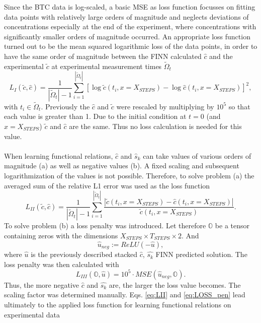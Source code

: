 Since the BTC data is log-scaled, a basic MSE as loss function focusses on fitting data points with relatively large orders of magnitude and neglects deviations of concentrations especially at the end of the experiment, where concentrations with significantly smaller orders of magnitude occurred. An appropriate loss function turned out to be the mean squared logarithmic loss of the data points, in order to have the same order of magnitude between the FINN calculated $\hat{c}$ and the experimental $\tilde{c}$ at experimental measurement times $\tilde{\Omega}_t$
\begin{equation}
    L_{I}(\tilde{c},\hat{c}) = \frac{1}{|\tilde{\Omega}_t|-1}\sum_{i=1}^{|\tilde{\Omega}_t|} \left[\log\tilde{c}(t_i,x = X_{STEPS}) - \log\hat{c}(t_i, x=X_{STEPS})\right]^2,
    \label{eq:LI}
\end{equation}
with $t_i \in \tilde{\Omega}_t$. Previously the $\hat{c}$ and $\tilde{c}$ were rescaled by multiplying by $10^{5}$ so that each value is greater than 1. Due to the initial condition at $t = 0$ (and $x = X_{STEPS}$) $\tilde{c}$ and $\hat{c}$ are the same. Thus no loss calculation is needed for this value.
\\
\\
When learning functional relations, $\hat{c}$ and $\hat{s}_k$ can take values of various orders of magnitude (a) as well as negative values (b). A fixed scaling and subsequent logarithmization of the values is not possible. Therefore, to solve problem (a) the averaged sum of the relative L1 error was used as the loss function
\begin{equation}
    L_{II}(\tilde{c},\hat{c}) = \frac{1}{|\tilde{\Omega}_t|-1}\sum_{i=1}^{|\tilde{\Omega}_t|} \frac{|\tilde{c}(t_i,x = X_{STEPS}) - \hat{c}(t_i, x=X_{STEPS})|}{\tilde{c}(t_i,x = X_{STEPS})}.
    \label{eq:LII}
\end{equation}
To solve problem (b) a loss penalty was introduced. Let therefore $\mathbb{O}$ be a tensor containing zeros with the dimensions $X_{STEPS} \times T_{STEPS} \times 2$. And
\begin{equation}
    \hat{u}_{neg} := ReLU(-\hat{u}),
\end{equation}
where $\hat{u}$ is the previously described stacked $\hat{c}$, $\hat{s_k}$ FINN predicted solution. The loss penalty was then calculated with
\begin{equation}
    L_{III}(\mathbb{O},\hat{u}) = 10^5 \cdot MSE(\hat{u}_{neg}, \mathbb{O}).
    \label{eq:LOSS_pen}
\end{equation}
Thus, the more negative $\hat{c}$ and $\hat{s_k}$ are, the larger the loss value becomes. The scaling factor was determined manually. Eqs. \ref{eq:LII} and \ref{eq:LOSS_pen} lead ultimately to the applied loss function for learning functional relations on experimental data
